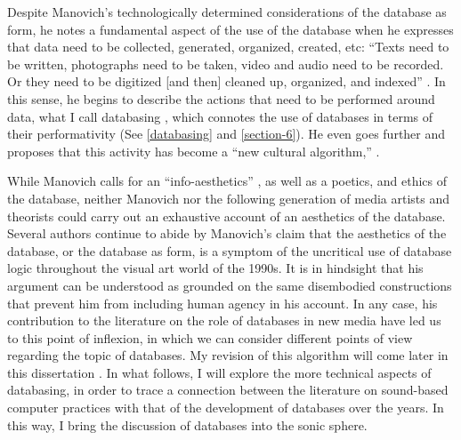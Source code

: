Despite Manovich's technologically determined considerations of the database as form, he notes a fundamental aspect of the use of the database when he expresses that data need to be collected, generated, organized, created, etc: ``Texts need to be written, photographs need to be taken, video and audio need to be recorded. Or they need to be digitized [and then] cleaned up, organized, and indexed'' \parencite[224]{Man01:The}. In this sense, he begins to describe the actions that need to be performed around data, what I call databasing , which connotes the use of databases in terms of their performativity (See \ref{databasing} and \ref{section-6}). He even goes further and proposes that this activity has become a ``new cultural algorithm,'' \parencite[225]{Man01:The} .


While Manovich calls for an ``info-aesthetics'' \parencite[217]{Man01:The}, as well as a poetics, and ethics of the database, neither Manovich nor the following generation of media artists and theorists could carry out an exhaustive account of an aesthetics of the database. Several authors continue to abide by Manovich's claim that the aesthetics of the database, or the database as form, is a symptom of the uncritical use of database logic throughout the visual art world of the 1990s. It is in hindsight that his argument can be understood as grounded on the same disembodied constructions that prevent him from including human agency in his account. In any case, his contribution to the literature on the role of databases in new media have led us to this point of inflexion, in which we can consider different points of view regarding the topic of databases. My revision of this algorithm will come later in this dissertation . In what follows, I will explore the more technical aspects of databasing, in order to trace a connection between the literature on sound-based computer practices with that of the development of databases over the years. In this way, I bring the discussion of databases into the sonic sphere.
